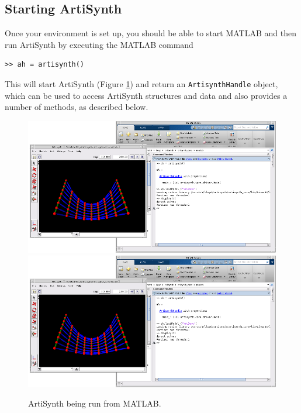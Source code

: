 \documentclass{article}
\begin{document}
\subsection{Starting ArtiSynth} 

Once your environment is set up, you should be able to start MATLAB
and then run ArtiSynth by executing the MATLAB command
%
\begin{lstlisting}[]
  >> ah = artisynth()
\end{lstlisting}
%
This will start ArtiSynth (Figure \ref{artisynthMatlab:fig}) and
return an {\tt ArtisynthHandle} object, which can be used to access
ArtiSynth structures and data and also provides a number of methods,
as described below.

\begin{figure}[t]
\begin{center}
\iflatexml
 \includegraphics[]{images/artisynthMatlab}
\else
 \includegraphics[width=6in]{images/artisynthMatlab}
\fi
\end{center}
\caption{ArtiSynth being run from MATLAB.}
\label{artisynthMatlab:fig}
\end{figure}
\end{document}
